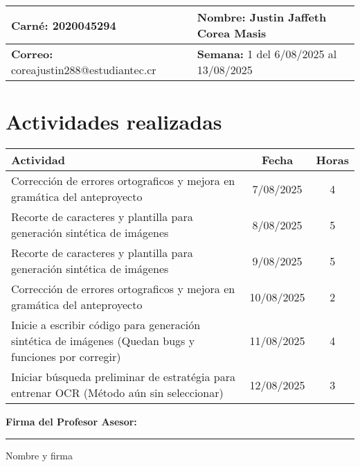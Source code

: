 \documentclass[12pt,a4paper]{article}
\begin{document}
\noindent
\begin{tabularx}{\textwidth}{|X|X|}
\hline
\textbf{Carné:} 2020045294 & \textbf{Nombre:} Justin Jaffeth Corea Masis \\
\hline
\textbf{Correo:} coreajustin288@estudiantec.cr & \textbf{Semana:} 1 del 6/08/2025 al 13/08/2025 \\
\hline
\end{tabularx}

\vspace{0.5cm}

\section*{Actividades realizadas}

\begin{tabularx}{\textwidth}{|>{\raggedright\arraybackslash}p{12cm}|c|c|}
\hline
\textbf{Actividad} & \textbf{Fecha} & \textbf{Horas} \\
\hline
Corrección de errores ortograficos y mejora en gramática del anteproyecto & 7/08/2025 & 4 \\
\hline
Recorte de caracteres y plantilla para generación sintética de imágenes & 8/08/2025 & 5 \\
\hline
Recorte de caracteres y plantilla para generación sintética de imágenes & 9/08/2025 & 5 \\
\hline
Corrección de errores ortograficos y mejora en gramática del anteproyecto & 10/08/2025 & 2 \\
\hline 
Inicie a escribir código para generación sintética de imágenes (Quedan bugs y funciones por corregir) & 11/08/2025 & 4 \\
\hline
Iniciar búsqueda preliminar de estratégia para entrenar OCR (Método aún sin seleccionar) & 12/08/2025 & 3 \\
\hline 
\end{tabularx}

\vspace{1cm}

\noindent
\textbf{Firma del Profesor Asesor:}

\vspace{2cm}

\noindent\rule{8cm}{0.4pt}  
Nombre y firma
\end{document}
